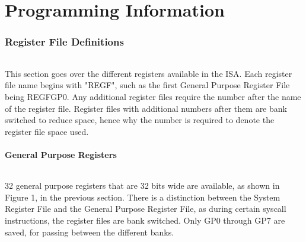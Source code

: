 \documentclass[letterpaper, 11pt]{article}
\begin{document}
\part{Programming Information}
\section{Register File Definitions}
\paragraph{}This section goes over the different registers available in the ISA. Each register file name begins with 
"REGF", such as the first General Purpose Register File being REGFGP0. Any additional register files require the number after the
name of the register file. Register files with additional numbers after them are bank switched to reduce space, hence why the number is
required to denote the register file space used.
\clearpage
\subsection{General Purpose Registers}
\paragraph{}32 general purpose registers that are 32 bits wide are available, as shown in Figure 1, in the previous section. 
There is a distinction between the System Register File and the General Purpose Register File, as during certain syscall
instructions, the register files are bank switched. Only GP0 through GP7 are saved, for passing between the different banks. 
\end{document}

